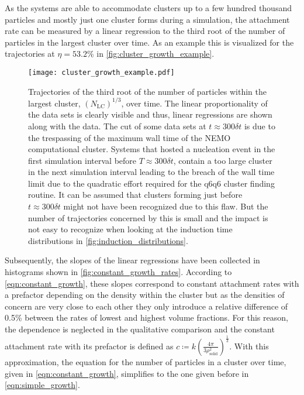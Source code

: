 As the systems are able to accommodate clusters up to a few hundred thousand particles and mostly just one cluster forms during a simulation, the attachment rate can be measured by a linear regression to the third root of the number of particles in the largest cluster over time. As an example this is visualized for the trajectories at $\eta=53.2\%$ in \autoref{fig:cluster_growth_example}.

\begin{figure}[h]
\centering
\texttt{[image: cluster\_growth\_example.pdf]}
\caption[Largest cluster trajectories from production data with constant attachment rates]{Trajectories of the third root of the number of particles within the largest cluster, $(N_{\text{LC}})^{1/3}$, over time. The linear proportionality of the data sets is clearly visible and thus, linear regressions are shown along with the data. The cut of some data sets at $t \approx 300 \delta t $ is due to the trespassing of the maximum wall time of the NEMO computational cluster. Systems that hosted a nucleation event in the first simulation interval before $T \approx 300\delta t  $, contain a too large cluster in the next simulation interval leading to the breach of the wall time limit due to the quadratic effort required for the q6q6 cluster finding routine. It can be assumed that clusters forming just before $t \approx 300 \delta t$ might not have been recognized due to this flaw. But the number of trajectories concerned by this is small and the impact is not easy to recognize when looking at the induction time distributions in \autoref{fig:induction_distributions}.}
\label{fig:cluster_growth_example}
\end{figure}

Subsequently, the slopes of the linear regressions have been collected in histograms shown in \autoref{fig:constant_growth_rates}. According to \autoref{eqn:constant_growth}, these slopes correspond to constant attachment rates with a prefactor depending on the density within the cluster but as the densities of concern are very close to each other they only introduce a relative difference of 0.5\% between the rates of lowest and highest volume fractions. For this reason, the dependence is neglected in the qualitative comparison and the constant attachment rate with its prefactor is defined as $ c \coloneqq k \left( \frac{4 \pi}{3 \rho_{\text{solid}}^2} \right)^\frac{1}{3} $. With this approximation, the equation for the number of particles in a cluster over time, given in \autoref{eqn:constant_growth}, simplifies to the one given before in \autoref{eqn:simple_growth}.\\ 

